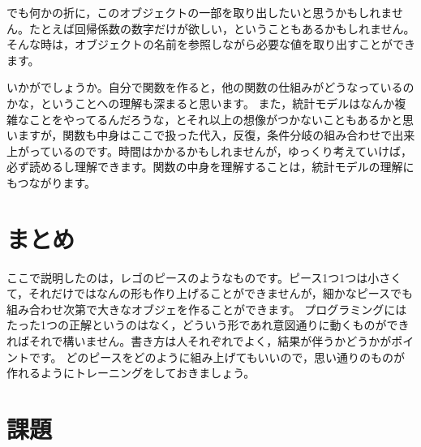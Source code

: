 \documentclass{ltjsbook}
\begin{document}
でも何かの折に，このオブジェクトの一部を取り出したいと思うかもしれません。たとえば回帰係数の数字だけが欲しい，ということもあるかもしれません。
そんな時は，オブジェクトの名前を参照しながら必要な値を取り出すことができます。

いかがでしょうか。自分で関数を作ると，他の関数の仕組みがどうなっているのかな，ということへの理解も深まると思います。
また，統計モデルはなんか複雑なことをやってるんだろうな，とそれ以上の想像がつかないこともあるかと思いますが，関数も中身はここで扱った代入，反復，条件分岐の組み合わせで出来上がっているのです。時間はかかるかもしれませんが，ゆっくり考えていけば，必ず読めるし理解できます。関数の中身を理解することは，統計モデルの理解にもつながります。

\section{まとめ}
ここで説明したのは，レゴのピースのようなものです。ピース1つ1つは小さくて，それだけではなんの形も作り上げることができませんが，細かなピースでも組み合わせ次第で大きなオブジェを作ることができます。
プログラミングにはたった1つの正解というのはなく，どういう形であれ意図通りに動くものができればそれで構いません。書き方は人それぞれでよく，結果が伴うかどうかがポイントです。
どのピースをどのように組み上げてもいいので，思い通りのものが作れるようにトレーニングをしておきましょう。

\section{課題}

\end{document}
